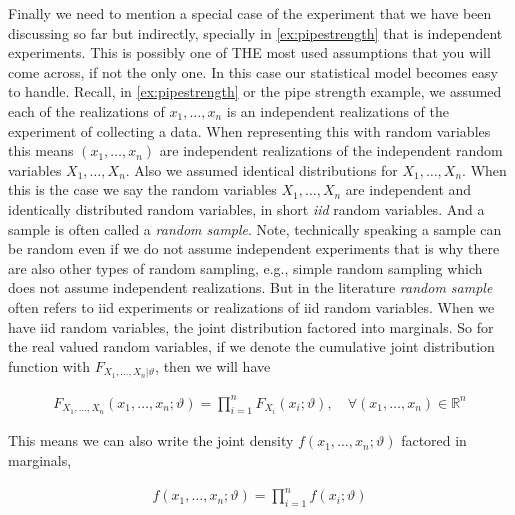 \documentclass[ 11pt,%
				a4paper,%
				twoside,%
				headinclude,%
				footinclude = true,%
				cleardoublepage = empty,%
				reqno]{scrbook}
\begin{document}
Finally we need to mention a special case of the experiment that we have been discussing so far but indirectly, specially in \cref{ex:pipestrength} that is independent experiments. This is possibly one of THE most used assumptions that you will come across, if not the only one. In this case our statistical model becomes easy to handle. Recall, in \cref{ex:pipestrength} or the pipe strength example, we assumed each of the realizations of $x_1, \ldots, x_n$ is an independent realizations of the experiment of collecting a data. When representing this with random variables this means $(x_1, \ldots, x_n)$ are independent realizations of the independent random variables $X_1, \ldots, X_n$. Also we assumed identical distributions for $X_1, \ldots, X_n$. When this is the case we say the random variables $X_1, \ldots, X_n$ are independent and identically distributed random variables, in short \emph{iid} random variables. And a sample is often called a \emph{random sample}. Note, technically speaking a sample can be random even if we do not assume independent experiments that is why there are also other types of random sampling, e.g., simple random sampling which does not assume independent realizations. But in the literature \emph{random sample} often refers to iid experiments or realizations of iid random variables. When we have iid random variables, the joint distribution factored into marginals. So for the real valued random variables, if we denote the cumulative joint distribution function with $F_{X_1, \ldots, X_n| \vartheta}$, then we will have 

\begin{align*}
F_{X_1, \ldots, X_n}(x_1, \ldots, x_n;\vartheta)= \prod_{i = 1}^{n} F_{X_i}(x_i;\vartheta), \quad \forall\left(x_{1}, \ldots, x_{n}\right) \in \mathbb{R}^{n}  
 \end{align*} 

This means we can also write the joint density $f\left(x_{1}, \ldots, x_{n};\vartheta\right)$ factored in marginals, 


\begin{align*}
    f\left(x_{1}, \ldots, x_{n};\vartheta\right)=\prod_{i=1}^{n} f\left(x_{i};\vartheta\right)
\end{align*}
\end{document}
